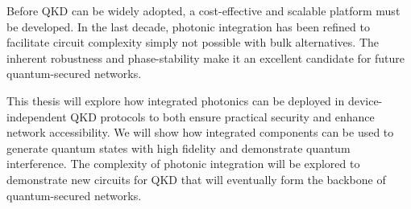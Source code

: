 Before \ac{QKD} can be widely adopted, a cost-effective and scalable platform must be developed. In the last decade, photonic integration has been refined to facilitate circuit complexity simply not possible with bulk alternatives. The inherent robustness and phase-stability make it an excellent candidate for future quantum-secured networks.

This thesis will explore how integrated photonics can be deployed in device-independent \ac{QKD} protocols to both ensure practical security and enhance network accessibility. We will show how integrated components can be used to generate quantum states with high fidelity and demonstrate quantum interference. The complexity of photonic integration will be explored to demonstrate new circuits for \ac{QKD} that will eventually form the backbone of quantum-secured networks.










\clearpage